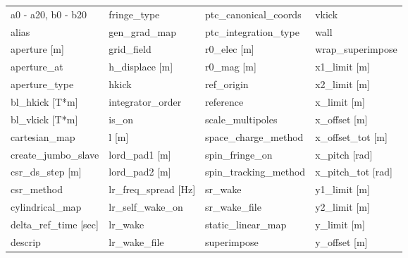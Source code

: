  \begin{tabular}{llll} \toprule
a0 - a20, b0 - b20               & fringe_type                      & ptc_canonical_coords             & vkick                            \\
alias                            & gen_grad_map                     & ptc_integration_type             & wall                             \\
aperture [m]                     & grid_field                       & r0_elec [m]                      & wrap_superimpose                 \\
aperture_at                      & h_displace [m]                   & r0_mag [m]                       & x1_limit [m]                     \\
aperture_type                    & hkick                            & ref_origin                       & x2_limit [m]                     \\
bl_hkick [T*m]                   & integrator_order                 & reference                        & x_limit [m]                      \\
bl_vkick [T*m]                   & is_on                            & scale_multipoles                 & x_offset [m]                     \\
cartesian_map                    & l [m]                            & space_charge_method              & x_offset_tot [m]                 \\
create_jumbo_slave               & lord_pad1 [m]                    & spin_fringe_on                   & x_pitch [rad]                    \\
csr_ds_step [m]                  & lord_pad2 [m]                    & spin_tracking_method             & x_pitch_tot [rad]                \\
csr_method                       & lr_freq_spread [Hz]              & sr_wake                          & y1_limit [m]                     \\
cylindrical_map                  & lr_self_wake_on                  & sr_wake_file                     & y2_limit [m]                     \\
delta_ref_time [sec]             & lr_wake                          & static_linear_map                & y_limit [m]                      \\
descrip                          & lr_wake_file                     & superimpose                      & y_offset [m]                     \\

\end{tabular}
